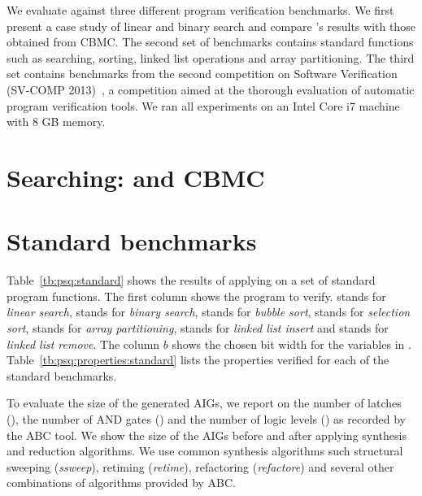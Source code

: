 We evaluate \mytool{} against three different program verification benchmarks. 
We first present a case study of linear and binary search and compare 
\mytool's results with those obtained from CBMC.
The second
set of benchmarks 
contains standard functions such as searching, sorting, linked list operations
and array partitioning. 
The third set contains benchmarks
from the second competition on Software Verification
(SV-COMP 2013)~\cite{svcomp}, a competition aimed at the thorough evaluation of 
automatic program verification tools. We ran all experiments on an
Intel Core i7 machine with 8 GB memory. 

\section{Searching: \mytool{} and CBMC}
\label{chap:res:casestudies}


\section{Standard benchmarks}
\label{chap:res:standardbench}

Table~\ref{tb:psq:standard} shows the results of applying 
\mytool{} on a set of standard program functions. The first column shows
the program \Pm to verify.  stands for {\em linear search}, 
 stands for {\em binary search},  stands for 
{\em bubble sort},  stands for {\em selection sort},
 stands for {\em array partitioning},  stands for 
{\em linked list insert} and  stands for {\em linked list remove}. 
The column $b$ shows the chosen bit width for the variables in \Pm. 
Table~\ref{tb:psq:properties:standard} lists the properties verified for each of the 
standard benchmarks. 



To evaluate the size of the generated AIGs, we report on the 
number of latches (), the number of AND  gates ()
and the number of logic levels () as recorded by the 
ABC tool. We show the size of the AIGs before and after applying 
synthesis and reduction algorithms. We use common synthesis 
algorithms such structural sweeping ({\em ssweep}), 
retiming ({\em retime}), refactoring ({\em refactore})
and several other combinations of algorithms provided by ABC. 

